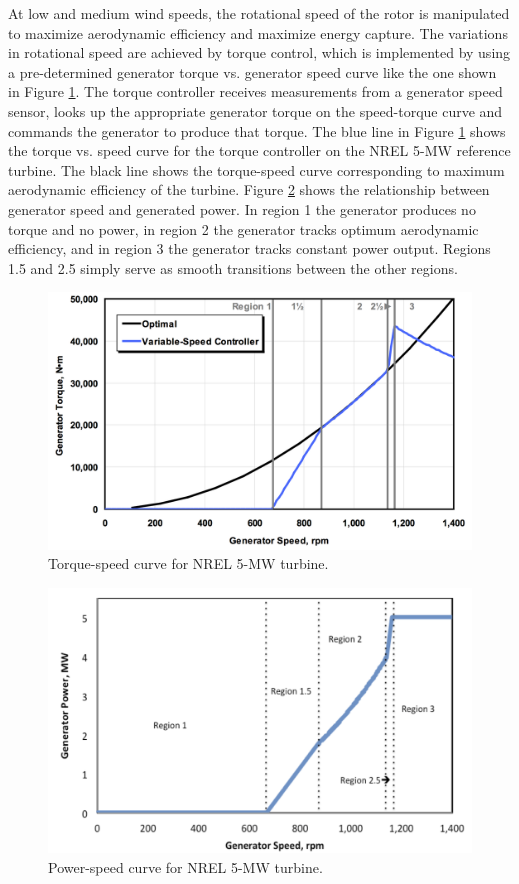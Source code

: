 At low and medium wind speeds, the rotational speed of the rotor is manipulated to maximize aerodynamic efficiency and maximize energy capture.  The variations in rotational speed are achieved by torque control, which is implemented by using a pre-determined generator torque vs. generator speed curve like the one shown in Figure \ref{fig1-2}.  The torque controller receives measurements from a generator speed sensor, looks up the appropriate generator torque on the speed-torque curve and commands the generator to produce that torque. The blue line in Figure \ref{fig1-2} shows the torque vs. speed curve for the torque controller on the NREL 5-MW reference turbine.  The black line shows the torque-speed curve corresponding to maximum aerodynamic efficiency of the turbine. Figure \ref{fig1-3} shows the relationship between generator speed and generated power. In region 1 the generator produces no torque and no power, in region 2 the generator tracks optimum aerodynamic efficiency, and in region 3 the generator tracks constant power output.  Regions 1.5 and 2.5 simply serve as smooth transitions between the other regions. 



\begin{figure}[htbp]
	\centering
		\includegraphics[width=.75\linewidth]{Figures/ch1Figures/fig1-2.png}
	\caption{Torque-speed curve for NREL 5-MW turbine.\cite{jonkman2009}}
	\label{fig1-2}
\end{figure}

\begin{figure}[htbp]
	\centering
		\includegraphics[width=.75\linewidth]{Figures/ch1Figures/fig1-3.png}
	\caption{Power-speed curve for NREL 5-MW turbine.}
	\label{fig1-3}
\end{figure}


